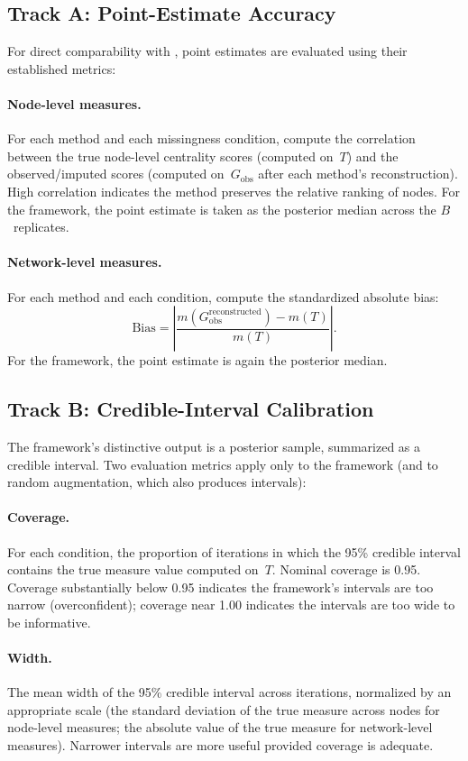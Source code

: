 \documentclass[11pt]{article}
\newcommand{\Gobs}{G_{\text{obs}}}
\begin{document}
\subsection{Track A: Point-Estimate Accuracy}

For direct comparability with \citet{SmithMorganMoody2022}, point estimates are evaluated using their established metrics:

\paragraph{Node-level measures.} For each method and each missingness condition, compute the correlation between the true node-level centrality scores (computed on~$T$) and the observed/imputed scores (computed on~$\Gobs$ after each method's reconstruction). High correlation indicates the method preserves the relative ranking of nodes. For the framework, the point estimate is taken as the posterior median across the $B$~replicates.

\paragraph{Network-level measures.} For each method and each condition, compute the standardized absolute bias:
\[
\text{Bias} = \left| \frac{m(\Gobs^{\text{reconstructed}}) - m(T)}{m(T)} \right|.
\]
For the framework, the point estimate is again the posterior median.

\subsection{Track B: Credible-Interval Calibration}

The framework's distinctive output is a posterior sample, summarized as a credible interval. Two evaluation metrics apply only to the framework (and to random augmentation, which also produces intervals):

\paragraph{Coverage.} For each condition, the proportion of iterations in which the 95\% credible interval contains the true measure value computed on~$T$. Nominal coverage is 0.95. Coverage substantially below 0.95 indicates the framework's intervals are too narrow (overconfident); coverage near 1.00 indicates the intervals are too wide to be informative.

\paragraph{Width.} The mean width of the 95\% credible interval across iterations, normalized by an appropriate scale (the standard deviation of the true measure across nodes for node-level measures; the absolute value of the true measure for network-level measures). Narrower intervals are more useful provided coverage is adequate.
\end{document}
